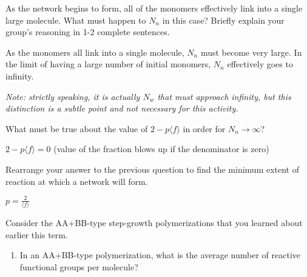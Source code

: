 \begin{activity}
\begin{ctqs}
	\question As the network begins to form, all of the monomers effectively link into a single large molecule.  What must happen to $N_n$ in this case?  Briefly explain your group's reasoning in 1-2 complete sentences.
	
		\begin{solution}[2in]
			As the monomers all link into a single molecule, $N_n$ must become very large.  In the limit of having a large number of initial monomers, $N_n$ effectively goes to infinity.
			
			\emph{Note: strictly speaking, it is actually $N_w$ that must approach infinity, but this distinction is a subtle point and not necessary for this activity.}
		\end{solution}
	
	\question What must be true about the value of $2-p\langle f \rangle$ in order for $N_n\to\infty$?
	
		\begin{solution}[1.5in]
			$2-p\langle f\rangle = 0$ (value of the fraction blows up if the denominator is zero)
		\end{solution}
	
	\question Rearrange your answer to the previous question to find the minimum extent of reaction at which a network will form.
	
		\begin{solution}[1in]
			$p = \frac{2}{\langle f \rangle}$
		\end{solution}
\end{ctqs}


\begin{exercises}

	
	
	
	\exercise Consider the AA+BB-type step-growth polymerizations that you learned about earlier this term.
	
		\begin{enumerate}
			\item In an AA+BB-type polymerization, what is the average number of reactive functional groups per molecule?
			

\end{enumerate}
\end{exercises}
\end{activity}
